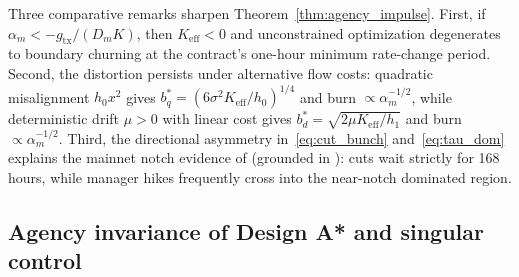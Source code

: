 Three comparative remarks sharpen Theorem~\ref{thm:agency_impulse}. First, if $\alpha_m < -g_{\mathrm{tx}}/(D_m K)$, then $K_{\mathrm{eff}} < 0$ and unconstrained optimization degenerates to boundary churning at the contract's one-hour minimum rate-change period. Second, the distortion persists under alternative flow costs: quadratic misalignment $h_0 x^2$ gives $b^*_q = (6\sigma^2 K_{\mathrm{eff}}/h_0)^{1/4}$ and burn $\propto \alpha_m^{-1/2}$, while deterministic drift $\mu > 0$ with linear cost gives $b^*_d = \sqrt{2\mu K_{\mathrm{eff}}/h_1}$ and burn $\propto \alpha_m^{-1/2}$. Third, the directional asymmetry in~\eqref{eq:cut_bunch} and~\eqref{eq:tau_dom} explains the mainnet notch evidence of \citet{companion2026} (grounded in \citealp{kleven2013using}): cuts wait strictly for 168 hours, while manager hikes frequently cross into the near-notch dominated region.

\subsection{Agency invariance of Design A* and singular control}\label{subsec:agency_astar}

